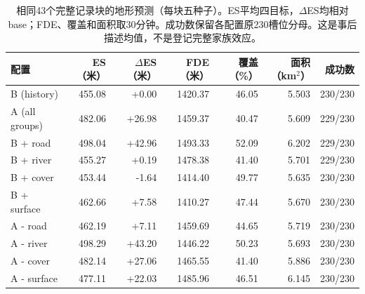 \begin{table}[!htbp]\centering
\caption{相同43个完整记录块的地形预测（每块五种子）。ES平均四目标，$\Delta$ES均相对base；FDE、覆盖和面积取30分钟。成功数保留各配置原230槽位分母。这是事后描述均值，不是登记完整家族效应。}\label{tab:terrain-description}
\small\setlength{\tabcolsep}{3pt}
\begin{tabular}{lrrrrrr}\toprule
配置 & ES（米） & $\Delta$ES（米） & FDE（米） & 覆盖（\%） & 面积（km$^2$） & 成功数\\\midrule
B (history) & 455.08 & +0.00 & 1420.37 & 46.05 & 5.503 & 230/230\\
A (all groups) & 482.06 & +26.98 & 1459.37 & 40.47 & 5.609 & 229/230\\
B + road & 498.04 & +42.96 & 1493.33 & 52.09 & 6.202 & 229/230\\
B + river & 455.27 & +0.19 & 1478.38 & 41.40 & 5.701 & 229/230\\
B + cover & 453.44 & -1.64 & 1414.40 & 49.77 & 5.635 & 230/230\\
B + surface & 462.66 & +7.58 & 1410.27 & 47.44 & 5.670 & 230/230\\
A - road & 462.19 & +7.11 & 1459.69 & 44.65 & 5.719 & 230/230\\
A - river & 498.29 & +43.20 & 1446.22 & 50.23 & 5.693 & 230/230\\
A - cover & 482.14 & +27.06 & 1465.55 & 41.40 & 5.886 & 230/230\\
A - surface & 477.11 & +22.03 & 1485.96 & 46.51 & 6.145 & 230/230\\
\bottomrule\end{tabular}
\end{table}
